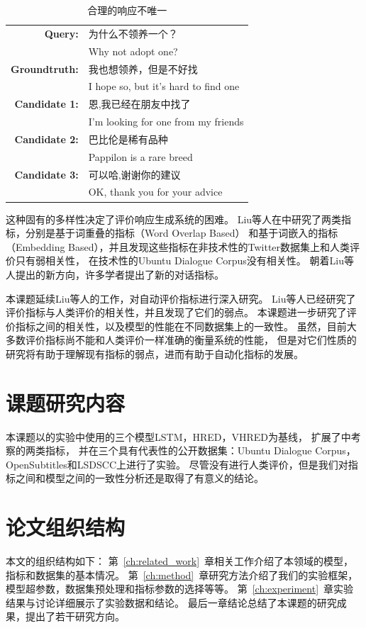 \begin{table}[H]
    \centering
    \caption{合理的响应不唯一}
    \label{tab:multiple_valid_responses}
    \begin{tabular}{rl}
        \toprule
        \textbf{Query:} & 为什么不领养一个？ \\
        & Why not adopt one? \\
        \textbf{Groundtruth:} & 我也想领养，但是不好找 \\
        & I hope so, but it's hard to find one \\
        \midrule
        \textbf{Candidate 1:} & 恩,我已经在朋友中找了 \\
        & I'm looking for one from my friends \\
        \textbf{Candidate 2:} & 巴比伦是稀有品种 \\
        & Pappilon is a rare breed \\
        \textbf{Candidate 3:} & 可以哈,谢谢你的建议 \\
        & OK, thank you for your advice \\
        \bottomrule
    \end{tabular}
\end{table}

这种固有的多样性决定了评价响应生成系统的困难。
Liu等人在中研究了两类指标，分别是基于词重叠的指标（Word Overlap Based）
和基于词嵌入的指标（Embedding Based），并且发现这些指标在非技术性的Twitter数据集上和人类评价只有弱相关性，
在技术性的Ubuntu Dialogue Corpus没有相关性。
朝着Liu等人提出的新方向，许多学者提出了新的对话指标。

本课题延续Liu等人的工作，对自动评价指标进行深入研究。
Liu等人已经研究了评价指标与人类评价的相关性，并且发现了它们的弱点。
本课题进一步研究了评价指标之间的相关性，以及模型的性能在不同数据集上的一致性。
虽然，目前大多数评价指标尚不能和人类评价一样准确的衡量系统的性能，
但是对它们性质的研究将有助于理解现有指标的弱点，进而有助于自动化指标的发展。

\section{课题研究内容}\label{sec:reseach_content}
本课题以的实验中使用的三个模型LSTM，HRED，VHRED为基线，
扩展了中考察的两类指标，
并在三个具有代表性的公开数据集：Ubuntu Dialogue Corpus，OpenSubtitles和LSDSCC上进行了实验。
尽管没有进行人类评价，但是我们对指标之间和模型之间的一致性分析还是取得了有意义的结论。

\section{论文组织结构}\label{sec:paper_organization}
本文的组织结构如下：
第~\ref{ch:related_work}~章相关工作介绍了本领域的模型，指标和数据集的基本情况。
第~\ref{ch:method}~章研究方法介绍了我们的实验框架，模型超参数，数据集预处理和指标参数的选择等等。
第~\ref{ch:experiment}~章实验结果与讨论详细展示了实验数据和结论。
最后一章结论总结了本课题的研究成果，提出了若干研究方向。
